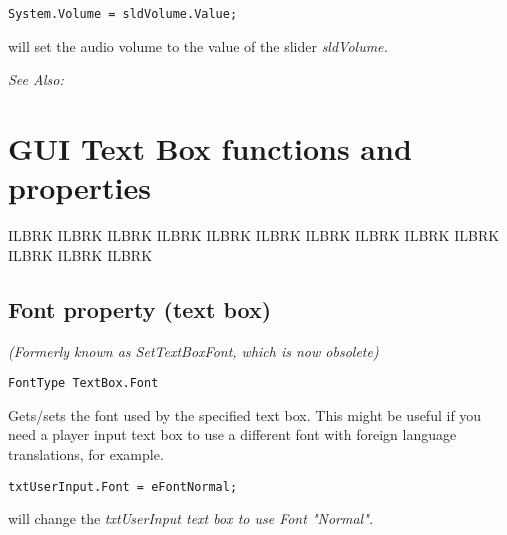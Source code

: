 \begin{verbatim}
System.Volume = sldVolume.Value;
\end{verbatim}
will set the audio volume to the value of the slider \it{sldVolume}.

\it{See Also:} 



\section{GUI Text Box functions and properties}%

ILBRK
ILBRK
ILBRK
ILBRK
ILBRK
ILBRK
ILBRK
ILBRK
ILBRK
ILBRK
ILBRK
ILBRK
ILBRK


\subsection{Font property (text box)}\label{TextBox.Font}%

\it{(Formerly known as SetTextBoxFont, which is now obsolete)}

\begin{verbatim}
FontType TextBox.Font
\end{verbatim}

Gets/sets the font used by the specified text box.
This might be useful if you need a player input text box to use a different
font with foreign language translations, for example.

\begin{verbatim}
txtUserInput.Font = eFontNormal;
\end{verbatim}
will change the \it{txtUserInput} text box to use Font "Normal".

